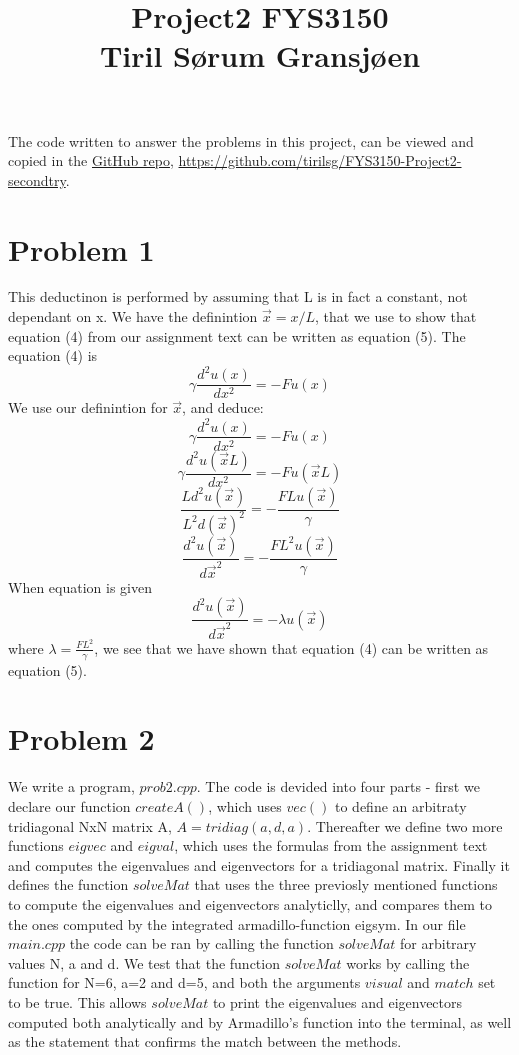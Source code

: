 \documentclass{article} %
\begin{document}
\title{Project2 FYS3150 \\ Tiril Sørum Gransjøen} %
\maketitle
   The code written to answer the problems in this project, 
  can be viewed and copied in the \href{https://github.com/tirilsg/FYS3150-Project2-secondtry}{GitHub repo}, 
  \url{https://github.com/tirilsg/FYS3150-Project2-secondtry}. 

  \section{Problem 1} 
  This deductinon is performed by assuming that L is in fact a constant, not dependant on x.
  We have the definintion $ \vec{x}=x/L $, that we use to show that equation (4) 
  from our assignment text can be written as equation (5). The equation (4) is 
  \begin{equation}
    \gamma \frac{d^2u(x)}{dx^2}=-Fu(x)\tag{4} 
  \end{equation}
  We use our definintion for $ \vec{x}$, and deduce:
  $$\gamma \frac{d^2u(x)}{dx^2}=-Fu(x) $$ 
  $$\gamma \frac{d^2u(\vec{x}L)}{dx^2}=-Fu(\vec{x}L) $$ 
  $$\frac{Ld^2u(\vec{x})}{L^2 d(\vec{x})^2}=-\frac{FLu(\vec{x})}{\gamma} $$ 
  $$\frac{d^2u(\vec{x})}{d\vec{x}^2}=-\frac{FL^2u(\vec{x})}{\gamma} $$ 
  When equation is given 
  \begin{equation}
  \frac{d^2u(\vec{x})}{d\vec{x}^2}=-\lambda u(\vec{x})\tag{5}
  \end{equation}  
  where $\lambda=\frac{FL^2}{\gamma}$, we see that we have shown that equation (4)
  can be written as equation (5). \\





  
  \section{Problem 2} 
  We write a program, $prob2.cpp$. The code is devided 
  into four parts - first we declare our function $createA()$, which uses $vec()$ to define an arbitraty tridiagonal 
  NxN matrix A, $A=tridiag(a,d,a)$. Thereafter we define two more functions $eigvec$ and $eigval$, which uses the 
  formulas from the assignment text and computes the eigenvalues and eigenvectors for a tridiagonal matrix.
  Finally it defines the function $solveMat$ that uses the three previosly mentioned functions to compute the eigenvalues
  and eigenvectors analyticlly, and compares them to the ones computed by the integrated armadillo-function eigsym. 
  In our file $main.cpp$ the code can be ran by calling the function $solveMat$ for arbitrary values N, a and d. We test
  that the function $solveMat$ works by calling the function for N=6, a=2 and d=5, and both the arguments $visual$ and $match$
  set to be true. This allows $solveMat$ to print the eigenvalues and eigenvectors computed both analytically and by Armadillo's 
  function into the terminal, as well as the statement that confirms the match between the methods. 
\end{document}
